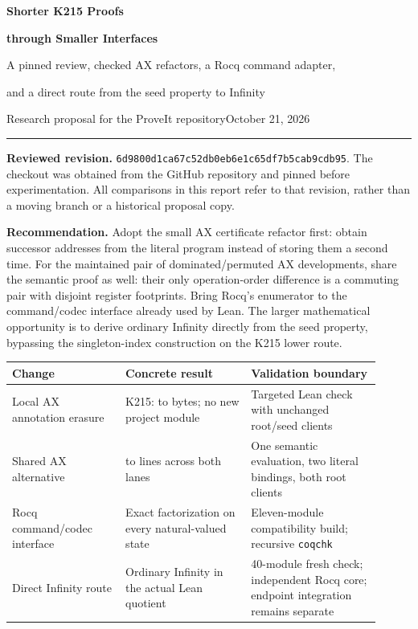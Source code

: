 \documentclass[11pt,letterpaper]{article}
\theoremstyle{definition}\newtheorem{definition}[theorem]{Definition}
\newcommand{\code}[1]{\texttt{#1}}
\newcommand{\pin}{6d9800d1ca67c52db0eb6e1c65df7b5cab9cdb95}
\begin{document}
\thispagestyle{empty}
{\color{ink}\LARGE\bfseries Shorter K215 Proofs\par}
{\color{ink}\LARGE\bfseries through Smaller Interfaces\par}
\vspace{6pt}
{\large A pinned review, checked AX refactors, a Rocq command adapter,\par
and a direct route from the seed property to Infinity\par}
\vspace{9pt}
{\small Research proposal for the ProveIt repository\hfill October 21, 2026\par}
\vspace{5pt}\hrule\vspace{7pt}

\textbf{Reviewed revision.} \nolinkurl{\pin}. The checkout was obtained from the
GitHub repository and pinned before experimentation. All comparisons in this report
refer to that revision, rather than a moving branch or a historical proposal copy.

\textbf{Recommendation.} Adopt the small AX certificate refactor first: obtain
successor addresses from the literal program instead of storing them a second time.
For the maintained pair of dominated/permuted AX developments, share the semantic
proof as well: their only operation-order difference is a commuting pair with
disjoint register footprints. Bring Rocq's enumerator to the command/codec interface
already used by Lean. The larger mathematical opportunity is to derive ordinary
Infinity directly from the seed property, bypassing the singleton-index construction
on the K215 lower route.

\begin{center}\small
\begin{tabular}{p{0.28\linewidth}p{0.31\linewidth}p{0.32\linewidth}}
\toprule
Change & Concrete result & Validation boundary \\
\midrule
Local AX annotation erasure & K215: \OldPermBytes{} to \LocalPermBytes{} bytes; no new project module & Targeted Lean check with unchanged root/seed clients \\
Shared AX alternative & \OldPairLines{} to \SharedLines{} lines across both lanes & One semantic evaluation, two literal bindings, both root clients \\
Rocq command/codec interface & Exact factorization on every natural-valued state & Eleven-module compatibility build; recursive \code{coqchk} \\
Direct Infinity route & Ordinary Infinity in the actual Lean quotient & 40-module fresh check; independent Rocq core; endpoint integration remains separate \\
\bottomrule
\end{tabular}
\end{center}
\end{document}
